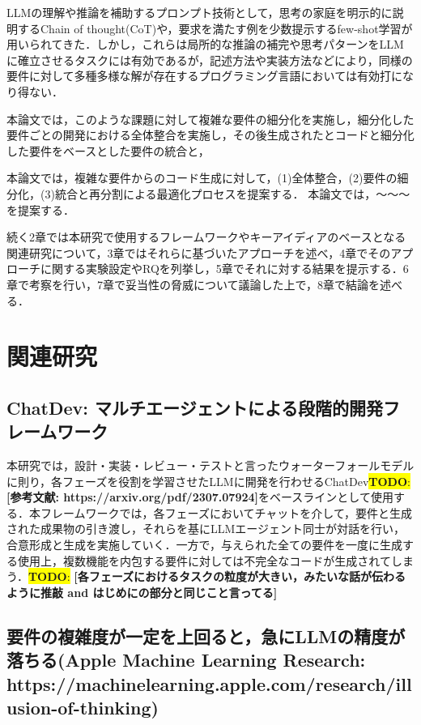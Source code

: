 \documentclass[submit,techrep,noauthor]{ipsj}
\newcommand{\todo}[1]{\colorbox{yellow}{{\bf TODO}:}{\color{red} {\textbf{[#1]}}}}
\begin{document}
LLMの理解や推論を補助するプロンプト技術として，思考の家庭を明示的に説明するChain of thought(CoT)や，要求を満たす例を少数提示するfew-shot学習が用いられてきた．しかし，これらは局所的な推論の補完や思考パターンをLLMに確立させるタスクには有効であるが，記述方法や実装方法などにより，同様の要件に対して多種多様な解が存在するプログラミング言語においては有効打になり得ない．

本論文では，このような課題に対して複雑な要件の細分化を実施し，細分化した要件ごとの開発における全体整合を実施し，その後生成されたとコードと細分化した要件をベースとした要件の統合と，

本論文では，複雑な要件からのコード生成に対して，(1)全体整合，(2)要件の細分化，(3)統合と再分割による最適化プロセスを提案する．
本論文では，〜〜〜を提案する．

続く2章では本研究で使用するフレームワークやキーアイディアのベースとなる関連研究について，3章ではそれらに基づいたアプローチを述べ，4章でそのアプローチに関する実験設定やRQを列挙し，5章でそれに対する結果を提示する．6章で考察を行い，7章で妥当性の脅威について議論した上で，8章で結論を述べる．

\section{関連研究}
\label{sec:format}

\subsection{ChatDev: マルチエージェントによる段階的開発フレームワーク}
本研究では，設計・実装・レビュー・テストと言ったウォーターフォールモデルに則り，各フェーズを役割を学習させたLLMに開発を行わせるChatDev\todo{参考文献: https://arxiv.org/pdf/2307.07924}をベースラインとして使用する．本フレームワークでは，各フェーズにおいてチャットを介して，要件と生成された成果物の引き渡し，それらを基にLLMエージェント同士が対話を行い，合意形成と生成を実施していく．一方で，与えられた全ての要件を一度に生成する使用上，複数機能を内包する要件に対しては不完全なコードが生成されてしまう．\todo{各フェーズにおけるタスクの粒度が大きい，みたいな話が伝わるように推敲 and はじめにの部分と同じこと言ってる}


\subsection{要件の複雑度が一定を上回ると，急にLLMの精度が落ちる(Apple Machine Learning Research: https://machinelearning.apple.com/research/illusion-of-thinking)}
\end{document}
